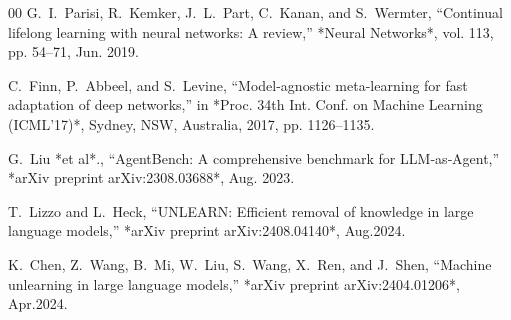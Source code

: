 \documentclass[conference]{IEEEtran}
\begin{document}
\begin{thebibliography}{00}
G.~I.~Parisi, R.~Kemker, J.~L.~Part, C.~Kanan, and S.~Wermter, “Continual lifelong learning with neural networks: A review,” *Neural Networks*, vol. 113, pp. 54–71, Jun. 2019.

C.~Finn, P.~Abbeel, and S.~Levine, “Model-agnostic meta-learning for fast adaptation of deep networks,” in *Proc. 34th Int. Conf. on Machine Learning (ICML’17)*, Sydney, NSW, Australia, 2017, pp. 1126–1135.

G.~Liu *et al*., “AgentBench: A comprehensive benchmark for LLM‑as‑Agent,” *arXiv preprint arXiv:2308.03688*, Aug. 2023.

T.~Lizzo and L.~Heck, “UNLEARN: Efficient removal of knowledge in large language models,” *arXiv preprint arXiv:2408.04140*, Aug.2024.

K.~Chen, Z.~Wang, B.~Mi, W.~Liu, S.~Wang, X.~Ren, and J.~Shen, “Machine unlearning in large language models,” *arXiv preprint arXiv:2404.01206*, Apr.2024.


\end{thebibliography}
\end{document}

